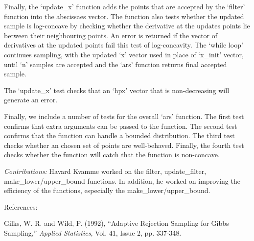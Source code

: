 \documentclass{article}
\begin{document}
Finally, the `update\_x' function adds the points that are accepted by the `filter' function into the abscissaes vector.  The function also tests whether the updated sample is log-concave by checking whether the derivative at the updates points lie between their neighbouring points.  An error is returned if the vector of derivatives at the updated points fail this test of log-concavity. The `while loop' continues sampling, with the updated `x' vector used in place of `x\_init' vector, until `n' samples are accepted and the `ars' function returns final accepted sample.

The `update\_x' test checks that an `hpx' vector that is non-decreasing will generate an error.

Finally, we include a number of tests for the overall `ars' function.  The first test confirms that extra arguments can be passed to the function. The second test confirms that the function can handle a bounded distribution.  The third test checks whether an chosen set of points are well-behaved.  Finally, the fourth test checks whether the function will catch that the function is non-concave.

\vspace{10 MM}

\emph{Contributions:} Havard Kvamme worked on the filter, update\_filter, make\_lower/upper\_bound functions. In addition, he worked on improving the efficiency of the functions, especially the make\_lower/upper\_bound.

\vspace{10 MM}

References:

Gilks, W. R. and Wild, P. (1992), ``Adaptive Rejection Sampling for Gibbs Sampling,'' \emph{Applied Statistics}, Vol. 41, Issue 2, pp. 337-348.
\end{document}
